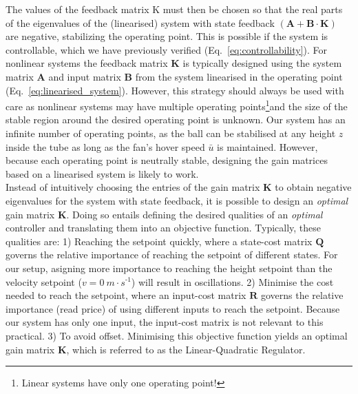 \documentclass[10pt,twoside,openright]{article}
\begin{document}
The values of the feedback matrix K must then be chosen so that the real parts of the eigenvalues of the (linearised) system with state feedback $(\bm{A} + \bm{B} \cdot \bm{K})$ are negative, stabilizing the operating point. This is possible if the system is controllable, which we have previously verified (Eq.~\ref{eq:controllability}). For nonlinear systems the feedback matrix $\bm{K}$ is typically designed using the system matrix $\bm{A}$ and input matrix $\bm{B}$ from the system linearised in the operating point (Eq.~\ref{eq:linearised_system}). However, this strategy should always be used with care as nonlinear systems may have multiple operating points\footnote{Linear systems have only one operating point!}and the size of the stable region around the desired operating point is unknown. Our system has an infinite number of operating points, as the ball can be stabilised at any height $z$ inside the tube as long as the fan's hover speed $\bar{u}$ is maintained. However, because each operating point is neutrally stable, designing the gain matrices based on a linearised system is likely to work.\\

Instead of intuitively choosing the entries of the gain matrix $\bm{K}$ to obtain negative eigenvalues for the system with state feedback, it is possible to design an \textit{optimal} gain matrix $\bm{K}$. Doing so entails defining the desired qualities of an \textit{optimal} controller and translating them into an objective function. Typically, these qualities are: 1) Reaching the setpoint quickly, where a state-cost matrix $\bm{Q}$ governs the relative importance of reaching the setpoint of different states. For our setup, asigning more importance to reaching the height setpoint than the velocity setpoint ($v=0~m \cdot s^{\text{-}1}$) will result in oscillations. 2) Minimise the cost needed to reach the setpoint, where an input-cost matrix $\bm{R}$ governs the relative importance (read price) of using different inputs to reach the setpoint. Because our system has only one input, the input-cost matrix is not relevant to this practical. 3) To avoid offset. Minimising this objective function yields an optimal gain matrix $\bm{K}$, which is referred to as the Linear-Quadratic Regulator.\\
\end{document}
